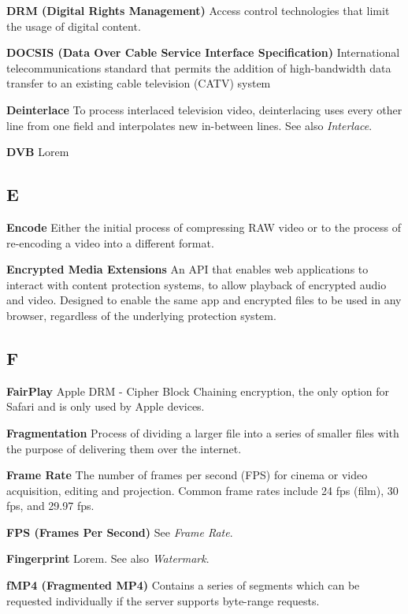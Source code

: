 \smallskip
\textbf{DRM (Digital Rights Management)}
Access control technologies that limit the usage of digital content.

\smallskip
\textbf{DOCSIS (Data Over Cable Service Interface Specification)}
International telecommunications standard that permits the addition of high-bandwidth data transfer to an existing cable television (CATV) system

\smallskip
\textbf{Deinterlace}
To process interlaced television video, deinterlacing uses every other line from one field and interpolates new in-between lines. See also \textit{Interlace}.

\smallskip
\textbf{DVB}
Lorem

\subsection{E}

\smallskip
\textbf{Encode}
Either the initial process of compressing RAW video or to the process of re-encoding a video into a different format.

\smallskip
\textbf{Encrypted Media Extensions}
An API that enables web applications to interact with content protection systems, to allow playback of encrypted audio and video. Designed to enable the same app and encrypted files to be used in any browser, regardless of the underlying protection system.

\subsection{F}

\smallskip
\textbf{FairPlay}
Apple DRM - Cipher Block Chaining encryption, the only option for Safari and is only used by Apple devices.

\smallskip
\textbf{Fragmentation}
Process of dividing a larger file into a series of smaller files with the purpose of delivering them over the internet.

\textbf{Frame Rate}
The number of frames per second (FPS) for cinema or video acquisition, editing and projection. Common frame rates include 24 fps (film), 30 fps, and 29.97 fps.

\textbf{FPS (Frames Per Second)}
See \textit{Frame Rate}.

\smallskip
\textbf{Fingerprint}
Lorem. See also \textit{Watermark}.

\smallskip
\textbf{fMP4 (Fragmented MP4)}
Contains a series of segments which can be requested individually if the server supports byte-range requests.

